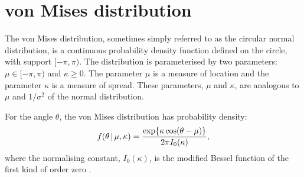 \section{von Mises distribution}

The von Mises distribution, sometimes simply referred to as the circular normal
distribution, is a continuous probability density function defined on the circle, with
support $[-\pi, \pi)$. The distribution is parameterised by two parameters: $\mu \in
[-\pi, \pi)$ and $\kappa \geq 0$. The parameter $\mu$ is a measure of location and the
parameter $\kappa$ is a measure of spread. These parameters, $\mu$ and $\kappa$, are
analogous to $\mu$ and $1/\sigma^2$ of the normal distribution.

For the angle $\theta$, the von Mises distribution has probability density:
\begin{equation}
	f(\theta \given \mu, \kappa) = \frac{\exp{\kappa \cos(\theta - \mu)}}%
	                                    {2 \pi I_0(\kappa)},
\end{equation}
where the normalising constant, $I_0(\kappa)$, is the modified Bessel function of the
first kind of order zero \parencite{jammalamadaka01}.
